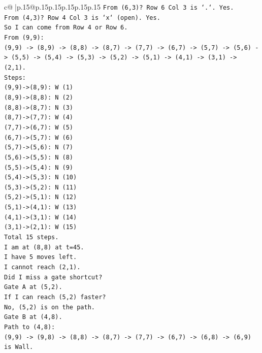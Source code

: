 \documentclass{article}
\begin{document}
{\begin{supertabular}{c@{$\;$}|p{.15\linewidth}@{}p{.15\linewidth}p{.15\linewidth}p{.15\linewidth}p{.15\linewidth}p{.15\linewidth}}
{{{\texttt{From (6,3)? Row 6 Col 3 is `.`. Yes.} \\
\texttt{From (4,3)? Row 4 Col 3 is `x` (open). Yes.} \\
\texttt{So I can come from Row 4 or Row 6.} \\
\texttt{From (9,9):} \\
\texttt{(9,9) {-}> (8,9) {-}> (8,8) {-}> (8,7) {-}> (7,7) {-}> (6,7) {-}> (5,7) {-}> (5,6) {-}> (5,5) {-}> (5,4) {-}> (5,3) {-}> (5,2) {-}> (5,1) {-}> (4,1) {-}> (3,1) {-}> (2,1).} \\
\texttt{Steps:} \\
\texttt{(9,9){-}>(8,9): W (1)} \\
\texttt{(8,9){-}>(8,8): N (2)} \\
\texttt{(8,8){-}>(8,7): N (3)} \\
\texttt{(8,7){-}>(7,7): W (4)} \\
\texttt{(7,7){-}>(6,7): W (5)} \\
\texttt{(6,7){-}>(5,7): W (6)} \\
\texttt{(5,7){-}>(5,6): N (7)} \\
\texttt{(5,6){-}>(5,5): N (8)} \\
\texttt{(5,5){-}>(5,4): N (9)} \\
\texttt{(5,4){-}>(5,3): N (10)} \\
\texttt{(5,3){-}>(5,2): N (11)} \\
\texttt{(5,2){-}>(5,1): N (12)} \\
\texttt{(5,1){-}>(4,1): W (13)} \\
\texttt{(4,1){-}>(3,1): W (14)} \\
\texttt{(3,1){-}>(2,1): W (15)} \\
\texttt{Total 15 steps.} \\
\texttt{I am at (8,8) at t=45.} \\
\texttt{I have 5 moves left.} \\
\texttt{I cannot reach (2,1).} \\
\texttt{Did I miss a gate shortcut?} \\
\texttt{Gate A at (5,2).} \\
\texttt{If I can reach (5,2) faster?} \\
\texttt{No, (5,2) is on the path.} \\
\texttt{Gate B at (4,8).} \\
\texttt{Path to (4,8):} \\
\texttt{(9,9) {-}> (9,8) {-}> (8,8) {-}> (8,7) {-}> (7,7) {-}> (6,7) {-}> (6,8) {-}> (6,9) is Wall.} \\
}}}
\end{supertabular}}
\end{document}
